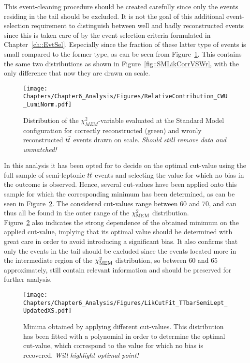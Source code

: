 This event-cleaning procedure should be created carefully since only the events residing in the tail should be excluded. It is not the goal of this additional event-selection requirement to distinguish between well and badly reconstructed events since this is taken care of by the event selection criteria formulated in Chapter~\ref{ch::EvtSel}.
Especially since the fraction of these latter type of events is small compared to the former type, as can be seen from Figure~\ref{fig::SMLikCorrVSWrUnSc}. This contains the same two distributions as shown in Figure~\ref{fig::SMLikCorrVSWr}, with the only difference that now they are drawn on scale.
\\
\begin{figure}[h!t]
 \centering
 \texttt{[image: Chapters/Chapter6\_Analysis/Figures/RelativeContribution\_CWU\_LumiNorm.pdf]}
 \caption{Distribution of the $\chi^{2}_{MEM}$-variable evaluated at the Standard Model configuration for correctly reconstructed (green) and wronly reconstructed $t\bar{t}$ events drawn on scale. \textit{Should still remove data and unmatched!}} \label{fig::SMLikCorrVSWrUnSc}
\end{figure}

In this analysis it has been opted for to decide on the optimal cut-value using the full sample of semi-leptonic $t\bar{t}$ events and selecting the value for which no bias in the outcome is observed.
Hence, several cut-values have been applied onto this sample for which the corresponding minimum has been determined, as can be seen in Figure~\ref{fig::CutValueFit}.
The considered cut-values range between 60 and 70, and can thus all be found in the outer range of the $\chi^{2}_{\textrm{MEM}}$ distribution.
\\
Figure~\ref{fig::CutValueFit} also indicates the strong dependence of the obtained minimum on the applied cut-value, implying that its optimal value should be determined with great care in order to avoid introducing a significant bias. It also confirms that only the events in the tail should be excluded since the events located more in the intermediate region of the $\chi^{2}_{\textrm{MEM}}$ distribution, so between $60$ and $65$ approximately, still contain relevant information and should be preserved for further analysis.
\\
\begin{figure}[h!t]
 \centering
 \texttt{[image: Chapters/Chapter6\_Analysis/Figures/LikCutFit\_TTbarSemiLept\_UpdatedXS.pdf]}
 \caption{Minima obtained by applying different cut-values. This distribution has been fitted with a polynomial in order to determine the optimal cut-value, which correspond to the value for which no bias is recovered. \textit{Will highlight optimal point!}} \label{fig::CutValueFit}
\end{figure}

